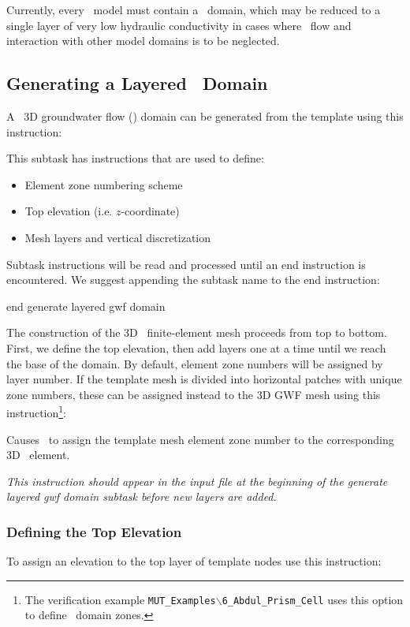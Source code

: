 \label{texfile:GWF}
Currently, every \mfus\ model must contain a \gwf\ domain, which may be reduced to a single layer of very low hydraulic conductivity in cases where \gwf\ flow and interaction with other model domains is to be neglected.

\subsection{Generating a Layered \gwf\ Domain}
A \mfus\ 3D groundwater flow (\gwf) domain can be generated from the template using this instruction:

    {This subtask has instructions that are used to define:
     \begin{itemize}
        \item Element zone numbering scheme
        \item Top elevation (i.e. $z$-coordinate)
        \item Mesh layers and vertical discretization
    \end{itemize}

    Subtask instructions will be read and processed until an \textsf{end} instruction is encountered.  We suggest appending the subtask name to the \textsf{end} instruction:

    {\Large \sf end generate layered gwf domain}
    }

The construction of the 3D \gwf\ finite-element mesh proceeds from top to bottom.  First, we define the top elevation, then add layers one at a time until we reach the base of the domain. By default, element zone numbers will be assigned by layer number.  If the template mesh is divided into horizontal patches with unique zone numbers, these can be assigned instead to the 3D GWF mesh using this instruction\footnote{The verification example \texttt{MUT\_Examples$\backslash$6\_Abdul\_Prism\_Cell} uses this option to define \swf\ domain zones.}:

    {Causes \mut\ to assign the template mesh element zone number to the corresponding 3D \gwf\ element.

    {\em This instruction should appear in the input file at the beginning of the \textsf{generate layered gwf domain} subtask before new layers are added.}
    }

\subsubsection{Defining the Top Elevation} \label{section:topelev}
To assign an elevation to the top layer of template nodes use this instruction:

